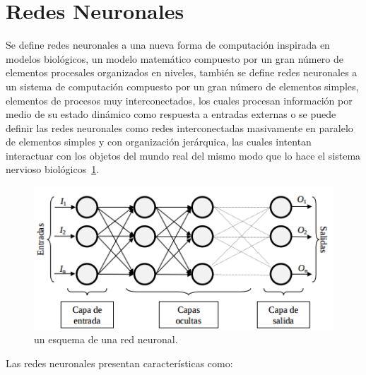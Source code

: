 \section{Redes Neuronales}
Se define redes neuronales a una nueva forma de computación inspirada en modelos biológicos, un modelo matemático compuesto
por un gran número de elementos procesales organizados en niveles, también se define redes neuronales a un sistema de computación compuesto 
por un gran número de elementos simples, elementos de procesos muy interconectados, los cuales procesan información por medio de su estado dinámico 
como respuesta a entradas externas o se puede definir las redes neuronales como redes interconectadas masivamente en paralelo de elementos simples y 
con organización jerárquica, las cuales intentan interactuar con los objetos del mundo real del mismo modo que lo hace el sistema nervioso 
biológicos~\ref{fig:rn}.
\begin{figure}[htb]
 \centering 
 \includegraphics[scale=0.7]{pictures/rn.png}
 \caption{ un esquema de una red neuronal.} 
 \label{fig:rn}
\end{figure}
\newpage
Las redes neuronales presentan características como:
